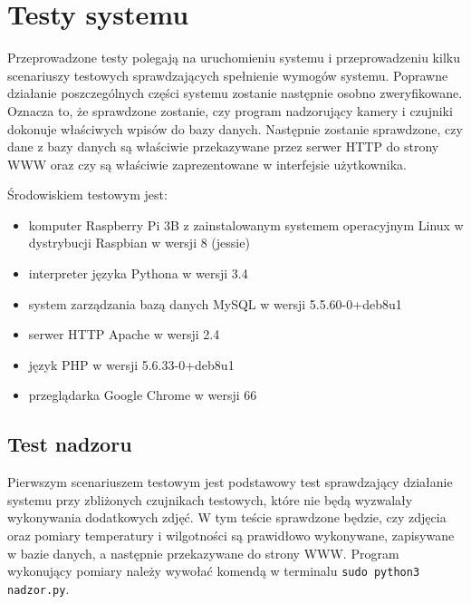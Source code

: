 \documentclass[a4paper,11pt,twoside]{article}
\begin{document}
\newpage
\section{Testy systemu}
Przeprowadzone testy polegają na uruchomieniu systemu i przeprowadzeniu kilku scenariuszy testowych sprawdzających spełnienie wymogów systemu. Poprawne działanie poszczególnych części systemu zostanie następnie osobno zweryfikowane. Oznacza to, że sprawdzone zostanie, czy program nadzorujący kamery i czujniki dokonuje właściwych wpisów do bazy danych. Następnie zostanie sprawdzone, czy dane z bazy danych są właściwie przekazywane przez serwer HTTP do strony WWW oraz czy są właściwie zaprezentowane w interfejsie użytkownika. 

Środowiskiem testowym jest:
\begin{itemize}
\item komputer Raspberry Pi 3B z zainstalowanym systemem operacyjnym Linux w dystrybucji Raspbian w wersji 8 (jessie) 
\item interpreter języka Pythona w wersji 3.4
\item system zarządzania bazą danych MySQL w wersji 5.5.60-0+deb8u1
\item serwer HTTP Apache w wersji 2.4
\item język PHP w wersji 5.6.33-0+deb8u1
\item przeglądarka Google Chrome w wersji 66
\end{itemize}

\subsection{Test nadzoru}
Pierwszym scenariuszem testowym jest podstawowy test sprawdzający działanie systemu przy zbliżonych czujnikach testowych, które nie będą wyzwalały wykonywania dodatkowych zdjęć. W tym teście sprawdzone będzie, czy zdjęcia oraz pomiary temperatury i wilgotności są prawidłowo wykonywane, zapisywane w bazie danych, a następnie przekazywane do strony WWW. Program wykonujący pomiary należy wywołać komendą w terminalu \texttt{sudo python3 nadzor.py}.
\end{document}
